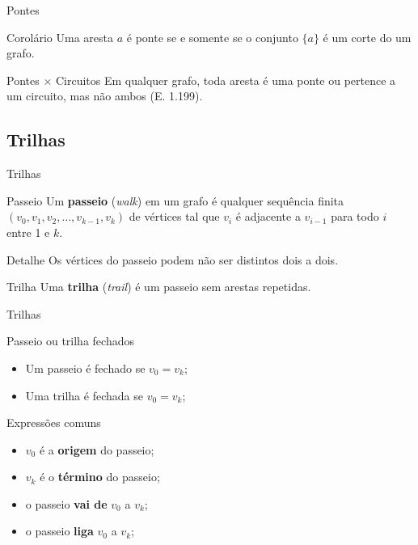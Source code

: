 \documentclass[xcolor=dvipsnames,table]{beamer}
\begin{document}
	\begin{frame}{Pontes}
		\begin{block}{Corolário}
			Uma aresta $a$ é ponte se e somente se o conjunto $\{ a \}$ é um corte do um grafo.
		\end{block}
		\begin{block}{Pontes $\times$ Circuitos}
			Em qualquer grafo, toda aresta é uma ponte ou pertence a um circuito, mas não ambos (E. 1.199).
		\end{block}
	\end{frame}
	
	\subsection{Trilhas}
	\begin{frame}{Trilhas}
		\begin{block}{Passeio}
	Um {\bf passeio} ({\it walk}) em um grafo é qualquer sequência finita $(v_0, v_1, v_2, \ldots, v_{k-1}, v_k)$ de vértices tal que $v_i$ é adjacente a $v_{i-1}$ para todo $i$ entre 1 e $k$.
		\end{block}
		\begin{block}{Detalhe}
			Os vértices do passeio podem não ser distintos dois a dois.
		\end{block}
		\begin{block}{Trilha}
			Uma {\bf trilha} ({\it trail}) é um passeio sem arestas repetidas.
		\end{block}
	\end{frame}
	
	\begin{frame}{Trilhas}
		\begin{block}{Passeio ou trilha fechados}
			\begin{itemize}
				\item Um passeio é fechado se $v_0 = v_k$;
				\item Uma trilha é fechada se $v_0 = v_k$;
			\end{itemize}			
		\end{block}
		\begin{block}{Expressões comuns}
			\begin{itemize}
				\item $v_0$ é a {\bf origem} do passeio;
				\item $v_k$ é o {\bf término} do passeio;
				\item o passeio {\bf vai de} $v_0$ a $v_k$;
				\item o passeio {\bf liga} $v_0$ a $v_k$;
			\end{itemize}
		\end{block}
	\end{frame}
	
\end{document}
